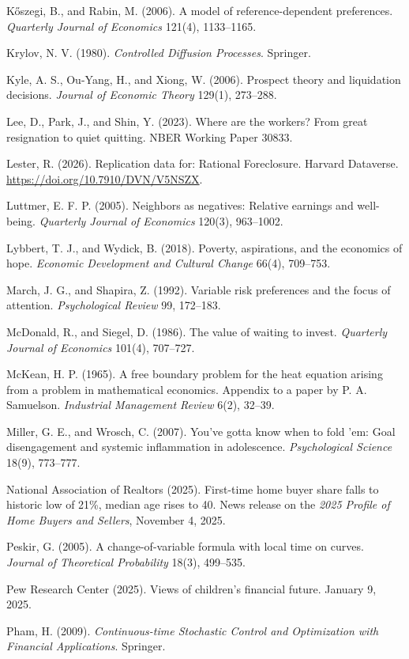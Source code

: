 K\H{o}szegi, B., and Rabin, M. (2006). A model of reference-dependent preferences. \emph{Quarterly Journal of Economics} 121(4), 1133--1165.

Krylov, N. V. (1980). \emph{Controlled Diffusion Processes}. Springer.

Kyle, A. S., Ou-Yang, H., and Xiong, W. (2006). Prospect theory and liquidation decisions. \emph{Journal of Economic Theory} 129(1), 273--288.

Lee, D., Park, J., and Shin, Y. (2023). Where are the workers? From great resignation to quiet quitting. NBER Working Paper 30833.

Lester, R. (2026). Replication data for: Rational Foreclosure. Harvard Dataverse. \url{https://doi.org/10.7910/DVN/V5NSZX}.

Luttmer, E. F. P. (2005). Neighbors as negatives: Relative earnings and well-being. \emph{Quarterly Journal of Economics} 120(3), 963--1002.

Lybbert, T. J., and Wydick, B. (2018). Poverty, aspirations, and the economics of hope. \emph{Economic Development and Cultural Change} 66(4), 709--753.

March, J. G., and Shapira, Z. (1992). Variable risk preferences and the focus of attention. \emph{Psychological Review} 99, 172--183.

McDonald, R., and Siegel, D. (1986). The value of waiting to invest. \emph{Quarterly Journal of Economics} 101(4), 707--727.

McKean, H. P. (1965). A free boundary problem for the heat equation arising from a problem in mathematical economics. Appendix to a paper by P. A. Samuelson. \emph{Industrial Management Review} 6(2), 32--39.

Miller, G. E., and Wrosch, C. (2007). You've gotta know when to fold 'em: Goal disengagement and systemic inflammation in adolescence. \emph{Psychological Science} 18(9), 773--777.

National Association of Realtors (2025). First-time home buyer share falls to historic low of 21\%, median age rises to 40. News release on the \emph{2025 Profile of Home Buyers and Sellers}, November 4, 2025.

Peskir, G. (2005). A change-of-variable formula with local time on curves. \emph{Journal of Theoretical Probability} 18(3), 499--535.

Pew Research Center (2025). Views of children's financial future. January 9, 2025.

Pham, H. (2009). \emph{Continuous-time Stochastic Control and Optimization with Financial Applications}. Springer.

